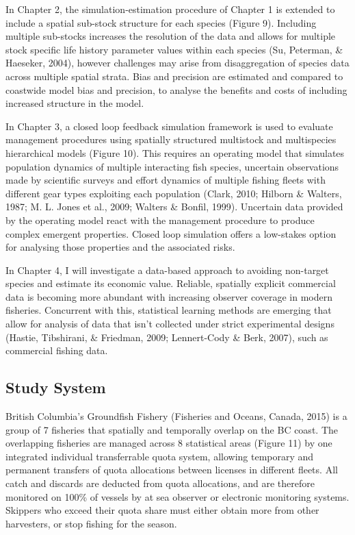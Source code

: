 \documentclass[12pt,]{scrartcl}
\begin{document}
In Chapter 2, the simulation-estimation procedure of Chapter 1 is
extended to include a spatial sub-stock structure for each species
(Figure 9). Including multiple sub-stocks increases the resolution of
the data and allows for multiple stock specific life history parameter
values within each species (Su, Peterman, \& Haeseker, 2004), however
challenges may arise from disaggregation of species data across multiple
spatial strata. Bias and precision are estimated and compared to
coastwide model bias and precision, to analyse the benefits and costs of
including increased structure in the model.

In Chapter 3, a closed loop feedback simulation framework is used to
evaluate management procedures using spatially structured multistock and
multispecies hierarchical models (Figure 10). This requires an operating
model that simulates population dynamics of multiple interacting fish
species, uncertain observations made by scientific surveys and effort
dynamics of multiple fishing fleets with different gear types exploiting
each population (Clark, 2010; Hilborn \& Walters, 1987; M. L. Jones et
al., 2009; Walters \& Bonfil, 1999). Uncertain data provided by the
operating model react with the management procedure to produce complex
emergent properties. Closed loop simulation offers a low-stakes option
for analysing those properties and the associated risks.

In Chapter 4, I will investigate a data-based approach to avoiding
non-target species and estimate its economic value. Reliable, spatially
explicit commercial data is becoming more abundant with increasing
observer coverage in modern fisheries. Concurrent with this, statistical
learning methods are emerging that allow for analysis of data that isn't
collected under strict experimental designs (Hastie, Tibshirani, \&
Friedman, 2009; Lennert-Cody \& Berk, 2007), such as commercial fishing
data.

\subsection{Study System}\label{study-system}

British Columbia's Groundfish Fishery (Fisheries and Oceans, Canada,
2015) is a group of 7 fisheries that spatially and temporally overlap on
the BC coast. The overlapping fisheries are managed across 8 statistical
areas (Figure 11) by one integrated individual transferrable quota
system, allowing temporary and permanent transfers of quota allocations
between licenses in different fleets. All catch and discards are
deducted from quota allocations, and are therefore monitored on 100\% of
vessels by at sea observer or electronic monitoring systems. Skippers
who exceed their quota share must either obtain more from other
harvesters, or stop fishing for the season.
\end{document}
